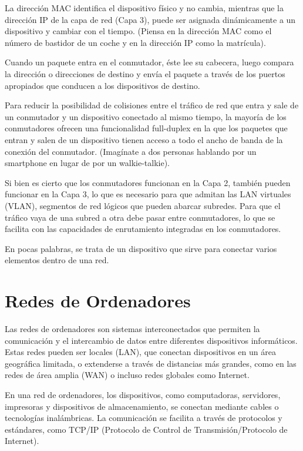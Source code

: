 \documentclass[a4paper, 12pt]{book}
\begin{document}
	La dirección MAC identifica el dispositivo físico y no cambia, mientras que la dirección IP de la capa de red (Capa 3), puede ser asignada dinámicamente a un dispositivo y cambiar con el tiempo. (Piensa en la dirección MAC como el número de bastidor de un coche y en la dirección IP como la matrícula).
	
	Cuando un paquete entra en el conmutador, éste lee su cabecera, luego compara la dirección o direcciones de destino y envía el paquete a través de los puertos apropiados que conducen a los dispositivos de destino.
	
	Para reducir la posibilidad de colisiones entre el tráfico de red que entra y sale de un conmutador y un dispositivo conectado al mismo tiempo, la mayoría de los conmutadores ofrecen una funcionalidad full-duplex en la que los paquetes que entran y salen de un dispositivo tienen acceso a todo el ancho de banda de la conexión del conmutador. (Imagínate a dos personas hablando por un smartphone en lugar de por un walkie-talkie).
	
	Si bien es cierto que los conmutadores funcionan en la Capa 2, también pueden funcionar en la Capa 3, lo que es necesario para que admitan las LAN virtuales (VLAN), segmentos de red lógicos que pueden abarcar subredes. Para que el tráfico vaya de una subred a otra debe pasar entre conmutadores, lo que se facilita con las capacidades de enrutamiento integradas en los conmutadores. 
	
	En pocas palabras, se trata de un dispositivo que sirve para conectar varios elementos dentro de una red.
	
	\section{Redes de Ordenadores} 
	\label{sec:redes}
	
	Las redes de ordenadores son sistemas interconectados que permiten la comunicación y el intercambio de datos entre diferentes dispositivos informáticos. Estas redes pueden ser locales (LAN), que conectan dispositivos en un área geográfica limitada, o extenderse a través de distancias más grandes, como en las redes de área amplia (WAN) o incluso redes globales como Internet.
	
	En una red de ordenadores, los dispositivos, como computadoras, servidores, impresoras y dispositivos de almacenamiento, se conectan mediante cables o tecnologías inalámbricas. La comunicación se facilita a través de protocolos y estándares, como TCP/IP (Protocolo de Control de Transmisión/Protocolo de Internet).
	
\end{document}
